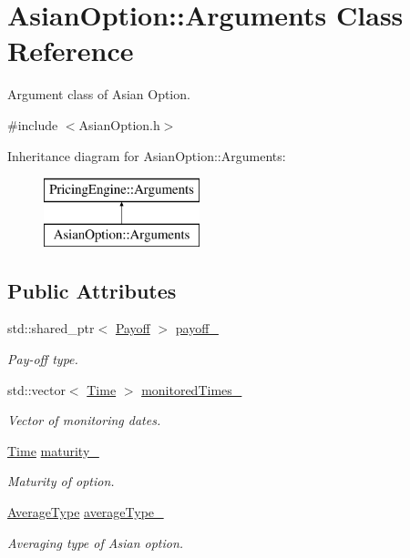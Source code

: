 \hypertarget{class_asian_option_1_1_arguments}{}\section{Asian\+Option\+:\+:Arguments Class Reference}
\label{class_asian_option_1_1_arguments}


Argument class of Asian Option.  




{\ttfamily \#include $<$Asian\+Option.\+h$>$}

Inheritance diagram for Asian\+Option\+:\+:Arguments\+:\begin{figure}[H]
\begin{center}
\leavevmode
\includegraphics[height=2.000000cm]{class_asian_option_1_1_arguments}
\end{center}
\end{figure}
\subsection*{Public Attributes}
\begin{DoxyCompactItemize}
\item 
std\+::shared\+\_\+ptr$<$ \hyperlink{class_payoff}{Payoff} $>$ \hyperlink{class_asian_option_1_1_arguments_ae44f022e21c05aa688d1d94a0f57d125}{payoff\+\_\+}
\begin{DoxyCompactList}\small\item\em Pay-\/off type. \end{DoxyCompactList}\item 
std\+::vector$<$ \hyperlink{_name_def_8h_ac2d3e0ba793497bcca555c7c2cf64ff3}{Time} $>$ \hyperlink{class_asian_option_1_1_arguments_a27e013476613aec57076742ba561a722}{monitored\+Times\+\_\+}
\begin{DoxyCompactList}\small\item\em Vector of monitoring dates. \end{DoxyCompactList}\item 
\hyperlink{_name_def_8h_ac2d3e0ba793497bcca555c7c2cf64ff3}{Time} \hyperlink{class_asian_option_1_1_arguments_ad39a2dee07ec9ec77cb64cb75e44a056}{maturity\+\_\+}
\begin{DoxyCompactList}\small\item\em Maturity of option. \end{DoxyCompactList}\item 
\hyperlink{class_asian_option_add7292791bf85820ff9fdbfd4407f3b9}{Average\+Type} \hyperlink{class_asian_option_1_1_arguments_aa93577b436b362136035ed3f6fc742bf}{average\+Type\+\_\+}
\begin{DoxyCompactList}\small\item\em Averaging type of Asian option. \end{DoxyCompactList}\end{DoxyCompactItemize}
